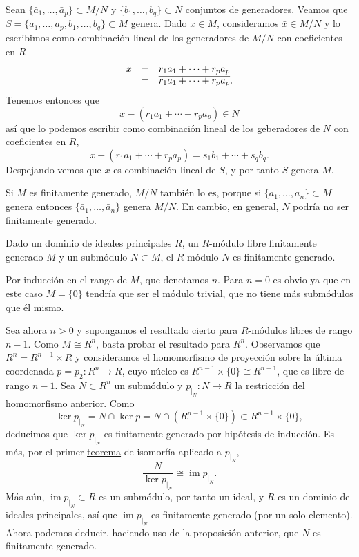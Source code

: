 Sean \(\{\bar a_1,\dots,\bar a_p\}\subset M/N\) y
\(\{b_1,\dots,b_q\}\subset N\) conjuntos de generadores. Veamos que
\(S=\{ a_1,\dots, a_p,b_1,\dots,b_q\}\subset M\) genera. Dado
\(x\in M\), consideramos \(\bar x\in M/N\) y lo escribimos como
combinación lineal de los generadores de \(M/N\) con coeficientes en
\(R\) \[\begin{array}{rcl}\bar x&=&r_1\bar a_1+\cdots+r_p\bar a_p\cr
&=&\overline{r_1a_1+\cdots+r_pa_p}.
\end{array}\] Tenemos entonces que \[x-(r_1a_1+\cdots+r_pa_p)\in N\]
así que lo podemos escribir como combinación lineal de los geberadores
de \(N\) con coeficientes en \(R\),
\[x-(r_1a_1+\cdots+r_pa_p)=s_1b_1+\cdots+s_qb_q.\] Despejando
vemos que \(x\) es combinación lineal de \(S\), y por tanto \(S\) genera
\(M\).\\


Si \(M\) es finitamente generado, \(M/N\) también lo es, porque si
\(\{a_1,\dots, a_n\}\subset M\) genera entonces
\(\{\bar{a}_1,\dots, \bar{a}_n\}\) genera \(M/N\). En cambio, en
general, \(N\) podría no ser finitamente generado. 


Dado un dominio de ideales principales \(R\), un \(R\)-módulo libre
finitamente generado \(M\) y un submódulo \(N\subset M\), el
\(R\)-módulo \(N\) es finitamente generado. 


Por inducción en el rango de \(M\), que denotamos \(n\). Para \(n=0\) es
obvio ya que en este caso \(M=\{0\}\) tendría que ser el módulo
trivial, que no tiene más submódulos que él mismo.

Sea ahora \(n>0\) y supongamos el resultado cierto para \(R\)-módulos
libres de rango \(n-1\). Como \(M\cong R^n\), basta probar el resultado
para \(R^n\). Observamos que \(R^n=R^{n-1}\times R\) y consideramos el
homomorfismo de proyección sobre la última coordenada
\(p=p_2\colon R^n\rightarrow R\), cuyo núcleo es
\(R^{n-1}\times \{0\}\cong R^{n-1}\), que es libre de rango \(n-1\).
Sea \(N\subset R^n\) un submódulo y \(p_{|_{N}}\colon N\rightarrow R\)
la restricción del homomorfismo anterior. Como
\[\ker p_{|_{N}}=N\cap \ker p= N\cap (R^{n-1}\times \{0\})\subset R^{n-1}\times \{0\},\]
deducimos que \(\ker p_{|_{N}}\) es finitamente generado por hipótesis
de inducción. Es más, por el primer
\protect\hyperlink{isomodules}{teorema} de isomorfía aplicado a
\(p_{|_{N}}\),
\[\frac{N}{\ker p_{|_{N}}}\cong \operatorname{im} p_{|_{N}}.\] Más
aún, \(\operatorname{im} p_{|_{N}}\subset R\) es un submódulo, por
tanto un ideal, y \(R\) es un dominio de ideales principales, así que
\(\operatorname{im} p_{|_{N}}\) es finitamente generado (por un solo
elemento). Ahora podemos deducir, haciendo uso de la proposición
anterior, que \(N\) es finitamente generado. 

